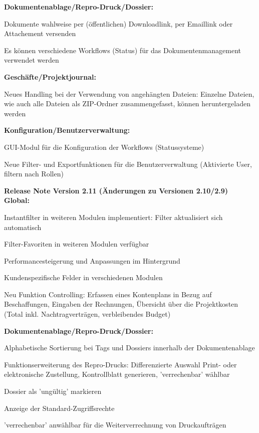 \textbf{Dokumentenablage/Repro-Druck/Dossier:}
\begin{compactitem}
  \item Dokumente wahlweise per (öffentlichen) Downloadlink, per Emaillink oder Attachement versenden
	\item Es können verschiedene Workflows (Status) für das Dokumentenmanagement verwendet werden
\end{compactitem}

\textbf{Geschäfte/Projektjournal:}
\begin{compactitem}
  \item Neues Handling bei der Verwendung von angehängten Dateien: Einzelne Dateien, wie auch alle Dateien als ZIP-Ordner zusammengefasst, können heruntergeladen werden
\end{compactitem}

\textbf{Konfiguration/Benutzerverwaltung:}
\begin{compactitem}
  \item GUI-Modul für die Konfiguration der Workflows (Statussysteme)
	\item Neue Filter- und Exportfunktionen für die Benutzerverwaltung (Aktivierte User, filtern nach Rollen)
\end{compactitem}

\vspace{\baselineskip}

\textbf{Release Note Version 2.11 (Änderungen zu Versionen 2.10/2.9)} \\
\textbf{Global:}
\begin{compactitem}
	\item Instantfilter in weiteren Modulen implementiert: Filter aktualisiert sich automatisch 
	\item Filter-Favoriten in weiteren Modulen verfügbar
	\item Performancesteigerung und Anpassungen im Hintergrund
	\item Kundenspezifische Felder in verschiedenen Modulen
	\item Neu Funktion Controlling: Erfassen eines Kontenplans in Bezug auf Beschaffungen, Eingaben der Rechnungen, Übersicht über die Projektkosten (Total inkl. Nachtragverträgen, verbleibendes Budget)
\end{compactitem}

\textbf{Dokumentenablage/Repro-Druck/Dossier:}
\begin{compactitem}
	\item Alphabetische Sortierung bei Tags und Dossiers innerhalb der Dokumentenablage
	\item Funktionserweiterung des Repro-Drucks: Differenzierte Auswahl Print- oder elektronische Zustellung, Kontrollblatt generieren, 'verrechenbar' wählbar
	\item Dossier als 'ungültig' markieren
	\item Anzeige der Standard-Zugriffsrechte
	\item 'verrechenbar' anwählbar für die Weiterverrechnung von Druckaufträgen
\end{compactitem}


